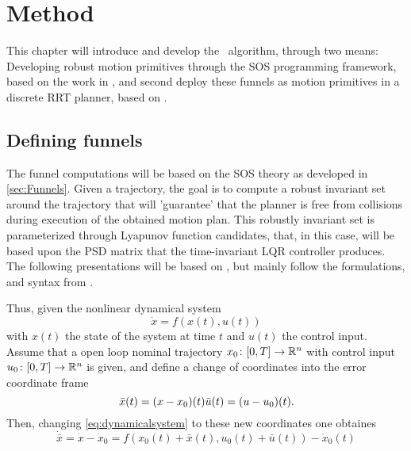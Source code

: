 \chapter{Method}

This chapter will introduce and develop the \rrtfunnel\ algorithm, through two
means: Developing robust motion primitives through the \ac{SOS} programming
framework, based on the work in \cite{majumdarFunnelLibrariesRealtime2017}, and
second deploy these funnels as motion primitives in a discrete \ac{RRT} planner,
based on \cite{lavalleLav98cPdf}.

\section{Defining funnels}

The funnel computations will be based on the \ac{SOS} theory as developed in
\ref{sec:Funnels}. Given a trajectory, the goal is to compute a robust invariant
set around the trajectory that will 'guarantee' that the planner is free from
collisions during execution of the obtained motion plan. This robustly invariant
set is parameterized through Lyapunov function candidates, that, in this case,
will be based upon the \ac{PSD} matrix that the time-invariant \ac{LQR}
controller produces. The following presentations will be based on
\cite{tobenkinInvariantFunnelsTrajectories2010,
  tedrakeLQRtreesFeedbackMotion2009, majumdarRobustOnlineMotion2013} , but
mainly follow the formulations, and syntax from
\cite{majumdarFunnelLibrariesRealtime2017}.

Thus, given the nonlinear dynamical system
\begin{equation}
  \label{eq:dynamicalsystem}
  \dot{x} = f(x(t), u(t))
\end{equation}
with \(x(t)\) the state of the system at time \(t\) and \(u(t)\) the control
input. Assume that a open loop nominal trajectory \(x_0 \colon [0,T] \rightarrow
\mathbb{R}^n\) with control input \(u_0 \colon [0,T] \rightarrow \mathbb{R}^n\) is given, and
define a change of coordinates into the error coordinate frame
\[
  \bar{x}(t) = (x - x_0)(t) \\
  \bar{u}(t) = (u - u_0)(t).
\]
Then, changing \ref{eq:dynamicalsystem} to these new coordinates one obtaines
\begin{equation}
  \dot{\bar{x}} = \dot{x} - \dot{x}_0 = f(x_0(t) + \bar{x}(t), u_0(t) + \bar{u}(t)) - \dot{x}_0(t)
\end{equation}

